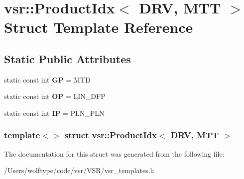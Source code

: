 \hypertarget{structvsr_1_1_product_idx_3_01_d_r_v_00_01_m_t_t_01_4}{\section{vsr\-:\-:Product\-Idx$<$ D\-R\-V, M\-T\-T $>$ Struct Template Reference}
\label{structvsr_1_1_product_idx_3_01_d_r_v_00_01_m_t_t_01_4}
}
\subsection*{Static Public Attributes}
\begin{DoxyCompactItemize}
\item 
\hypertarget{structvsr_1_1_product_idx_3_01_d_r_v_00_01_m_t_t_01_4_a9936498ad91760edcf329e95174ecc93}{static const int {\bfseries G\-P} = M\-T\-D}\label{structvsr_1_1_product_idx_3_01_d_r_v_00_01_m_t_t_01_4_a9936498ad91760edcf329e95174ecc93}

\item 
\hypertarget{structvsr_1_1_product_idx_3_01_d_r_v_00_01_m_t_t_01_4_a698ce92e417a8665284484a993479095}{static const int {\bfseries O\-P} = L\-I\-N\-\_\-\-D\-F\-P}\label{structvsr_1_1_product_idx_3_01_d_r_v_00_01_m_t_t_01_4_a698ce92e417a8665284484a993479095}

\item 
\hypertarget{structvsr_1_1_product_idx_3_01_d_r_v_00_01_m_t_t_01_4_aea0ea6f012caf12b35e472c3270dea0b}{static const int {\bfseries I\-P} = P\-L\-N\-\_\-\-P\-L\-N}\label{structvsr_1_1_product_idx_3_01_d_r_v_00_01_m_t_t_01_4_aea0ea6f012caf12b35e472c3270dea0b}

\end{DoxyCompactItemize}
\subsubsection*{template$<$$>$ struct vsr\-::\-Product\-Idx$<$ D\-R\-V, M\-T\-T $>$}



The documentation for this struct was generated from the following file\-:\begin{DoxyCompactItemize}
\item 
/\-Users/wolftype/code/vsr/\-V\-S\-R/vsr\-\_\-templates.\-h\end{DoxyCompactItemize}
